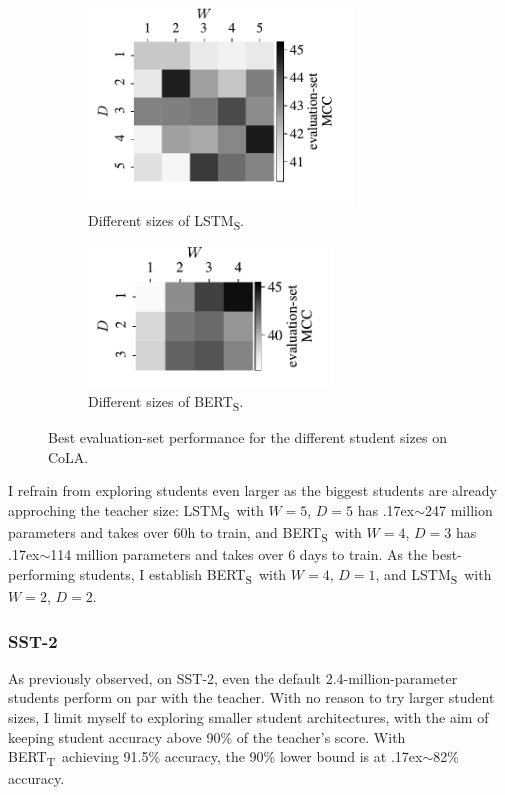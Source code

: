\documentclass[bsc,frontabs,singlespacing,parskip,deptreport]{infthesis}
\def\mytilde{{\raise.17ex\hbox{$\scriptstyle\sim$}}}
\def\BERTT{BERT\textsubscript{T}}
\def\BERTS{BERT\textsubscript{S}}
\def\LSTMS{LSTM\textsubscript{S}}
\begin{document}
{{{{        \begin{figure}
          \centering
          \begin{subfigure}{.5\textwidth}
            \centering
            \includegraphics[width=7cm]{../experiments/analysis/img/size-cola-lstm-map}
            \caption{Different sizes of \LSTMS.}
            \label{fig:size-cola-lstm}
          \end{subfigure}%
          \begin{subfigure}{.5\textwidth}
            \centering
            \includegraphics[width=6.5cm]{../experiments/analysis/img/size-cola-bert-map}
            \caption{Different sizes of \BERTS.}
            \label{fig:size-cola-bert}
          \end{subfigure}
          \caption{Best evaluation-set performance for the different student sizes on CoLA.}
          \label{fig:size-cola}
        \end{figure}
        
        I refrain from exploring students even larger as the biggest students are already approching the teacher size: \LSTMS~with $W=5$, $D=5$ has \mytilde247 million parameters and takes over 60h to train, and \BERTS~with $W=4$, $D=3$ has \mytilde114 million parameters and takes over 6 days to train.
        As the best-performing students, I establish \BERTS~with $W=4$, $D=1$, and \LSTMS~with $W=2$, $D=2$.
      }

      \subsubsection{SST-2}{
        As previously observed, on SST-2, even the default 2.4-million-parameter students perform on par with the teacher. With no reason to try larger student sizes, I limit myself to exploring smaller student architectures, with the aim of keeping student accuracy above 90\% of the teacher's score. With \BERTT~achieving 91.5\% accuracy, the 90\% lower bound is at \mytilde82\% accuracy.

}}}}
\end{document}
